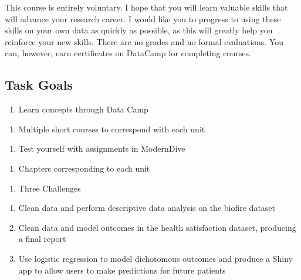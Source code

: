 \documentclass[
]{book}
\providecommand{\tightlist}{%
  \setlength{\itemsep}{0pt}\setlength{\parskip}{0pt}}
\begin{document}
This course is entirely voluntary. I hope that you will learn valuable skills that will advance your research career. I would like you to progress to using these skills on your own data as quickly as possible, as this will greatly help you reinforce your new skills. There are no grades and no formal evaluations. You can, however, earn certificates on DataCamp for completing courses.

\hypertarget{task-goals}{%
\subsection{Task Goals}\label{task-goals}}

\begin{enumerate}
\def\labelenumi{\arabic{enumi}.}
\tightlist
\item
  Learn concepts through Data Camp\\
\end{enumerate}

\begin{enumerate}
\def\labelenumi{\alph{enumi}.}
\tightlist
\item
  Multiple short courses to correspond with each unit
\end{enumerate}

\begin{enumerate}
\def\labelenumi{\arabic{enumi}.}
\setcounter{enumi}{1}
\tightlist
\item
  Test yourself with assignments in ModernDive
\end{enumerate}

\begin{enumerate}
\def\labelenumi{\alph{enumi}.}
\tightlist
\item
  Chapters corresponding to each unit
\end{enumerate}

\begin{enumerate}
\def\labelenumi{\arabic{enumi}.}
\setcounter{enumi}{2}
\tightlist
\item
  Three Challenges
\end{enumerate}

\begin{enumerate}
\def\labelenumi{\alph{enumi}.}
\tightlist
\item
  Clean data and perform descriptive data analysis on the biofire dataset
\item
  Clean data and model outcomes in the health satisfaction dataset, producing a final report
\item
  Use logistic regression to model dichotomous outcomes and produce a Shiny app to allow users to make predictions for future patients
\end{enumerate}
\end{document}
